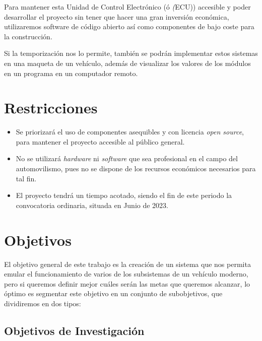Para mantener esta Unidad de Control Electrónico (ó \textit(ECU)) accesible y poder desarrollar el proyecto sin tener que hacer una gran inversión económica, utilizaremos software de código abierto así como componentes de bajo coste para la construcción.

Si la temporización nos lo permite, también se podrán implementar estos sistemas en una maqueta de un vehículo, además de visualizar los valores de los módulos en un programa en un computador remoto.  


\section{Restricciones}

\begin{itemize}
\item Se priorizará el uso de componentes asequibles y con licencia \textit{open source}, para mantener el proyecto accesible al público general.
\item No se utilizará \textit{hardware} ni \textit{software} que sea profesional en el campo del automovilismo, pues no se dispone de los recursos económicos necesarios para tal fin.
\item El proyecto tendrá un tiempo acotado, siendo el fin de este periodo la convocatoria ordinaria, situada en Junio de 2023.


\end{itemize}


\section{Objetivos}

El objetivo general de este trabajo es la creación de un sistema que nos permita emular el funcionamiento de varios de los subsistemas de un vehículo moderno, pero si queremos definir mejor cuáles serán las metas que queremos alcanzar, lo óptimo es segmentar este objetivo en un conjunto de subobjetivos, que dividiremos en dos tipos:
\newpage

\subsection{Objetivos de Investigación}

